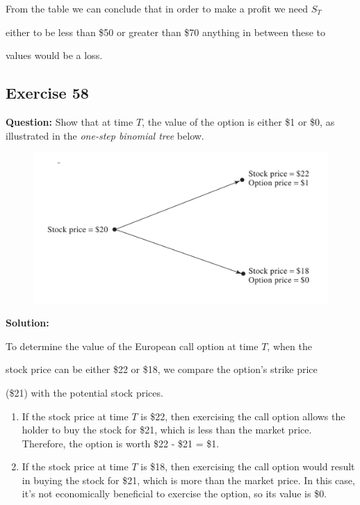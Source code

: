 \documentclass{article}
\begin{document}
From the table we can conclude that in order to make a profit we need $S_T$ 

either to be less than \$50 or greater than \$70 anything in between these to 

values would be a loss.

\newpage

\subsection*{Exercise 58}
\textbf{Question:} Show that at time $T$, the value of the option is either \$1 or \$0, as illustrated in the {\em one-step binomial tree} below.
\begin{center}
\begin{figure}[h]

\includegraphics[scale=0.5]{tree-ex.png}

\end{figure}
\end{center}

\textbf{Solution:}

To determine the value of the European call option at time $T$, when the 

stock price can be either \$22 or \$18, we compare the option's strike price 

(\$21) with the potential stock prices.

\begin{enumerate}
    \item If the stock price at time $T$ is \$22, then exercising the call option allows the holder to buy the stock for \$21, which is less than the market price. Therefore, the option is worth \$22 - \$21 = \$1.
    \item If the stock price at time $T$ is \$18, then exercising the call option would result in buying the stock for \$21, which is more than the market price. In this case, it's not economically beneficial to exercise the option, so its value is \$0.
\end{enumerate}
\end{document}
